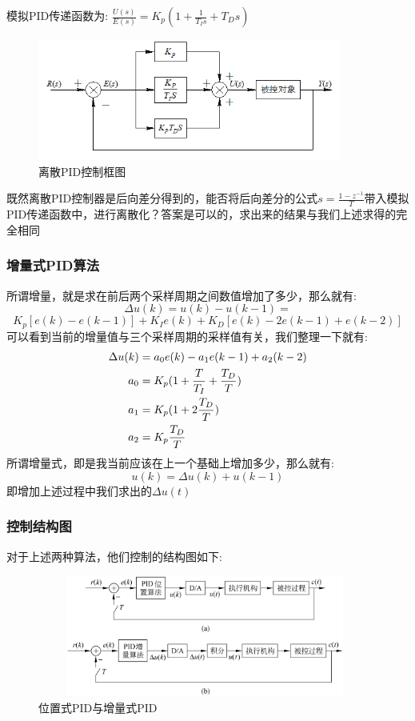 \documentclass[12pt, a4paper, oneside]{ctexbook}
\begin{document}
模拟PID传递函数为:
$\frac{U(s)}{E(s)}=K_p(1+\frac{1}{T_Is}+T_Ds)$
\begin{figure}[htbp]
	\centering
	\includegraphics[width=10cm,height=4cm]{img/5_3.png}
	\caption{离散PID控制框图}
\end{figure}

既然离散PID控制器是后向差分得到的，能否将后向差分的公式$s=\frac{1-z^{-1}}{T}$带入模拟PID传递函数中，进行离散化？答案是可以的，求出来的结果与我们上述求得的完全相同
\subsubsection{增量式PID算法} 
所谓增量，就是求在前后两个采样周期之间数值增加了多少，那么就有:
$$
\Delta u(k)=u(k)-u(k-1)=
$$
$$
K_p[e(k)-e(k-1)]+K_I
e(k)+K_D[e(k)-2e(k-1)+e(k-2)]
$$
可以看到当前的增量值与三个采样周期的采样值有关，我们整理一下就有:
\begin{equation}
	\begin{aligned}
		\Delta u(k)&=a_0e(k)-a_1e(k-1)+a_2(k-2)\\ \notag
		a_0&=K_p(1+\frac{T}{T_I}+\frac{T_D}{T})\\ \notag
		a_1&=K_p(1+2\frac{T_D}{T})\\ \notag
		a_2&=K_p\frac{T_D}{T} \notag
	\end{aligned}
\end{equation}
所谓增量式，即是我当前应该在上一个基础上增加多少，那么就有:
$$
u(k)=\Delta u(k)+u(k-1)
$$
即增加上述过程中我们求出的$\Delta u(t)$
\subsubsection{控制结构图} 
对于上述两种算法，他们控制的结构图如下:
\begin{figure}[htbp]
	\centering
	\includegraphics[width=11cm,height=4cm]{img/5_4.png}
	\caption{位置式PID与增量式PID}
\end{figure}
\end{document}
